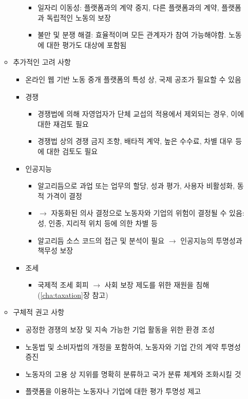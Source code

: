 \begin{itemize}
\begin{itemize}
\begin{itemize}
\begin{itemize}
			\item 일자리 이동성: 플랫폼과의 계약 중지, 다른 플랫폼과의 계약, 플랫폼과 독립적인 노동의 보장
			\item 불만 및 분쟁 해결: 효율적이며 모든 관계자가 참여 가능해야함. 노동에 대한 평가도 대상에 포함됨
			\end{itemize}
		\end{itemize}
	\item 추가적인 고려 사항 
		\begin{itemize}
		\item 온라인 웹 기반 노동 중개 플랫폼의 특성 상, 국제 공조가 필요할 수 있음
		\item 경쟁
			\begin{itemize}
			\item 경쟁법에 의해 자영업자가 단체 교섭의 적용에서 제외되는 경우, 이에 대한 재검토 필요
			\item 경쟁법 상의 경쟁 금지 조항, 배타적 계약, 높은 수수료, 차별 대우 등에 대한 검토도 필요
			\end{itemize}
		\item 인공지능
			\begin{itemize}
			\item 알고리듬으로 과업 또는 업무의 할당, 성과 평가, 사용자 비활성화, 동적 가격이 결정
			\item $\rightarrow$ 자동화된 의사 결정으로 노동자와 기업의 위험이 결정될 수 있음: 성, 인종, 지리적 위치 등에 의한 차별 등
			\item 알고리듬 소스 코드의 접근 및 분석이 필요 $\rightarrow$ 인공지능의 투명성과 책무성 보장
			\end{itemize}
		\item 조세
			\begin{itemize}
			\item 국제적 조세 회피 $\rightarrow$ 사회 보장 제도를 위한 재원을 침해 (\ref{cha:taxation}장 참고)
			\end{itemize}
		\end{itemize}
	\item 구체적 권고 사항 
		\begin{itemize}
		\item 공정한 경쟁의 보장 및 지속 가능한 기업 활동을 위한 환경 조성
		\item 노동법 및 소비자법의 개정을 포함하여, 노동자와 기업 간의 계약 투명성 증진
		\item 노동자의 고용 상 지위를 명확히 분류하고 국가 분류 체계와 조화시킬 것
		\item 플랫폼을 이용하는 노동자나 기업에 대한 평가 투명성 제고

\end{itemize}
\end{itemize}
\end{itemize}
